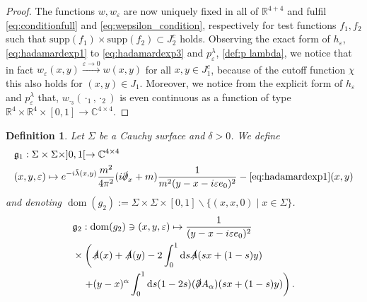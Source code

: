 \documentclass[b5paper,draft,openbib,12pt]{memoir}
\newtheorem{Def}{Definition}
\DeclareMathOperator{\dom}{dom}
\begin{document}
\begin{proof}
The functions \(w, w_\varepsilon\) are now uniquely fixed 
in all of \(\mathbb{R}^{4+4}\) and fulfil 
\eqref{eq:conditionfull} and \eqref{eq:wepsilon_condition}, 
respectively
for test functions \(f_1,f_2\) such that 
\(\mathrm{supp}(f_1)\times \mathrm{supp}(f_2) 
\subset J_2^c\) holds. Observing the exact form of 
\(h_\varepsilon\), \eqref{eq:hadamardexp1} to 
\eqref{eq:hadamardexp3} and \(p_\varepsilon^{\lambda}\), 
\eqref{def:p lambda}, we notice that in fact 
\(w_{\varepsilon}(x,y) \xrightarrow{\varepsilon\rightarrow 0} 
w(x,y)\) for all \(x,y\in J_1^c\), because of the cutoff 
function \(\chi\) this also holds for \((x,y)\in J_1\). 
Moreover, we notice from the explicit form of 
\(h_\varepsilon\) and \(p_\varepsilon^{\lambda}\) that,
\(w_{\cdot_3}(\cdot_1,\cdot_2)\) is even continuous as a 
function of type \(\mathbb{R}^4\times\mathbb{R}^4\times
[0,1]\rightarrow \mathbb{C}^{4\times 4}\).
\end{proof}

\begin{Def}
Let \(\Sigma\) be a Cauchy surface and \(\delta>0\).
We define
\begin{align}
&\mathfrak{g}_1: \Sigma\times\Sigma\times ]0,1[\rightarrow \mathbb{C}^{4\times 4}\\
&(x,y,\varepsilon)\mapsto e^{-i\tilde{\lambda}(x,y)} \frac{m^2}{4\pi^2} (i\slashed{\partial}_x+m)\frac{1}{m^2(y-x-i\varepsilon e_0)^2} - \eqref{eq:hadamardexp1}(x,y)
\end{align}
and denoting \(\dom(g_2):=\Sigma\times\Sigma\times [0,1]\backslash \{(x,x,0)\mid x\in\Sigma\}\).
\begin{align}
&\mathfrak{g}_2:\dom(g_2)\ni (x,y,\varepsilon)\mapsto \frac{1}{(y-x-i\varepsilon e_0)^2} \\
&\times \left(\slashed{A}(x) + \slashed{A}(y)
-  2 \int_0^1 \mathrm{d}s \slashed{A}(s x + (1-s)y)  \right.\\
&\quad \left.+(y-x)^\alpha \int_0^1 \mathrm{d}s (1-2s) (\slashed{\partial}A_\alpha)(sx+(1-s)y)   \right).
\end{align}
\end{Def}
\end{document}
